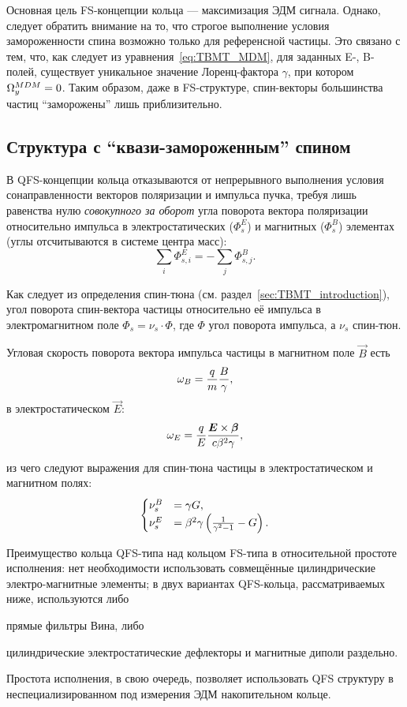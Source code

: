 Основная цель FS-концепции кольца --- максимизация ЭДМ сигнала. Однако, следует обратить внимание на то, что строгое выполнение условия замороженности спина возможно только для референсной частицы. Это связано с тем, что, как следует из уравнения~\eqref{eq:TBMT_MDM}, для заданных E-, B-полей, существует уникальное значение Лоренц-фактора $\gamma$, при котором ${\Omega_y^{MDM} = 0}$. Таким образом, даже в FS-структуре, спин-векторы большинства частиц ``заморожены'' лишь приблизительно.

\subsection{Структура с ``квази-замороженным'' спином} \label{chpt2:concept:QFS}
В QFS-концепции кольца отказываются от непрерывного выполнения условия сонаправленности векторов поляризации и импульса пучка, требуя лишь равенства нулю \emph{совокупного за оборот} угла поворота вектора поляризации относительно импульса в электростатических ($\Phi_s^E$) и магнитных ($\Phi_s^B$) элементах (углы отсчитываются в системе центра масс):~\cite{Senichev:Lattices}
\begin{equation*}
	\sum_i \Phi_{s,i}^E = -\sum_j \Phi_{s,j}^B.
\end{equation*}

Как следует из определения спин-тюна (см. раздел~\ref{sec:TBMT_introduction}), угол поворота спин-вектора частицы относительно её импульса в электромагнитном поле ${\Phi_s = \nu_s \cdot \Phi}$, где $\Phi$ угол поворота импульса, а $\nu_s$ спин-тюн.

Угловая скорость поворота вектора импульса частицы в магнитном поле $\vec B$ есть 
\[
\omega_B = \frac qm \frac B \gamma,
\]
в электростатическом $\vec E$:
\[
\omega_E = \frac qE \frac{\boldsymbol E\times \boldsymbol\beta}{c\beta^2\gamma},
\]

из чего следуют выражения для спин-тюна частицы в электростатическом и магнитном полях:
\begin{equation}
	\begin{cases}
		\nu_s^B &= \gamma G, \\
		\nu_s^E &= \beta^2\gamma\bkt{\frac{1}{\gamma^2-1} - G}.
	\end{cases}
\end{equation}

Преимущество кольца QFS-типа над кольцом FS-типа в относительной простоте исполнения: нет необходимости использовать совмещённые цилиндрические электро-магнитные элементы; в двух вариантах QFS-кольца, рассматриваемых ниже, используются либо
\begin{enumerate*}
\item прямые фильтры Вина, либо
\item цилиндрические электростатические дефлекторы и магнитные диполи раздельно.
\end{enumerate*}
Простота исполнения, в свою очередь, позволяет использовать QFS структуру в неспециализированном под
измерения ЭДМ накопительном кольце.

